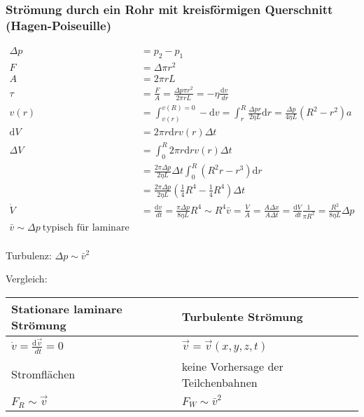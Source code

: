 \documentclass[a4paper]{scrartcl}
\renewcommand{\d}{\mathrm{d}}
\renewcommand{\v}[1]{\vec{#1}}
\newcommand{\dd}[2]{\frac{\d #1}{\ d#2}}
\theoremstyle{definition}
\theoremstyle{plain}
\theoremstyle{plain}
\theoremstyle{remark}
\theoremstyle{remark}
\theoremstyle{remark}
\begin{document}
\subsubsection{Strömung durch ein Rohr mit kreisförmigen Querschnitt (Hagen-Poiseuille)}
\label{sec-9-6-3}
\begin{align*}
\Delta p &= p_2 - p_1 \\
F &= \Delta \pi r^2 \\
A &= 2\pi r L \\
\tau &= \frac{F}{A} = \frac{\Delta p \pi r^2}{2\pi r L} = -\eta \dd{v}{r} \tag{Newton!} \\
v(r) &= \int_{v(r)}^{v(R) = 0}- \d v = \int_{r}^{R} \frac{\Delta p r}{2 \eta L} \d r = \frac{\Delta p}{4 \eta L}(R^2 - r^2)a \\
\d V &= 2\pi r \d r v(r) \Delta t \\
\Delta V &= \int_{0}^{R}2\pi r \d r v(r) \Delta t \\
&= \frac{2\pi \Delta p}{2\eta L}\Delta t \int_{0}^{R}(R^2 r - r^3) \d r \\
&= \frac{2\pi \Delta p}{2\eta L}(\frac{1}{4} R^4 - \frac{1}{4} R^4) \Delta t \\
\dot{V} &= \dd{v}{t} = \frac{\pi \Delta p}{8\eta L} R^4 \sim R^4 \tag{Hagen-Posieuilles-Gesetz}
\bar v = \frac{\dot{V}}{A} = \frac{A \Delta x}{A \Delta t} = \dd{V}{t} \frac{1}{\pi R^2} = \frac{R^2}{8\eta L}\Delta p \\
\bar v \sim \Delta p ~\text{typisch für laminare Strömung} \\
\end{align*}

Turbulenz:
$\Delta p \sim \bar v^2$

Vergleich:
\begin{center}
\begin{tabular}{ll}
Stationare laminare Strömung & Turbulente Strömung\\
\hline
$\dot{v} = \dd{\v v}{t} = 0$ & $\v v = \v v(x,y,z,t)$\\
Stromflächen & keine Vorhersage der Teilchenbahnen\\
$F_R \sim \v v$ & $F_W \sim \bar v^2$\\
\end{tabular}
\end{center}
\end{document}
